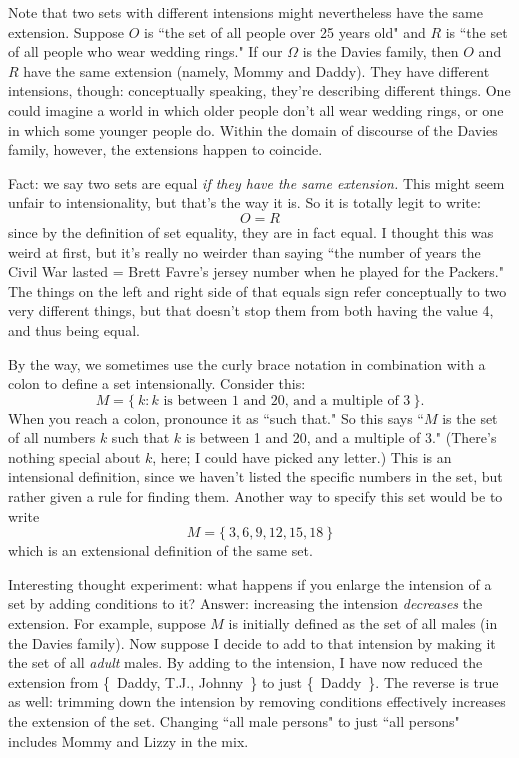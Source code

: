 Note that two sets with different intensions might nevertheless have
the same extension. Suppose $O$ is ``the set of all people over 25 years
old" and $R$ is ``the set of all people who wear wedding rings." If our
$\Omega$ is the Davies family, then $O$ and $R$ have the same extension
(namely, Mommy and Daddy). They have different intensions, though:
conceptually speaking, they're describing different things. One could
imagine a world in which older people don't all wear wedding rings, or one
in which some younger people do. Within the domain of discourse of the
Davies family, however, the extensions happen to coincide.

Fact: we say two sets are equal \textit{if they have the same extension.}
 This might seem unfair to intensionality, but
that's the way it is. So it is totally legit to write:
\[
O = R
\]
since by the definition of set equality, they are in fact equal. I thought
this was weird at first, but it's really no weirder than saying ``the
number of years the Civil War lasted = Brett Favre's jersey number when he
played for the Packers." The things on the left and right side of that
equals sign refer conceptually to two very different things, but that
doesn't stop them from both having the value 4, and thus being equal.

By the way, we sometimes use the curly brace notation in combination with a
colon to define a set intensionally. Consider this:
\[
M = \{~k : \text{$k$ is between 1 and 20, and a multiple of 3}~\}.
\]
When you reach a colon, pronounce it as ``such that." So this says ``$M$ is
the set of all numbers $k$ such that $k$ is between 1 and 20, and a
multiple of 3." (There's nothing special about $k$, here; I could have
picked any letter.) This is an intensional definition, since we haven't listed
the specific numbers in the set, but rather given a rule for finding them.
Another way to specify this set would be to write
\[
M = \{~3,6,9,12,15,18~\}
\]
which is an extensional definition of the same set.

Interesting thought experiment: what happens if you enlarge the intension
of a set by adding conditions to it?  Answer: increasing the intension
\textit{decreases} the extension. For example, suppose $M$ is initially
defined as the set of all males (in the Davies family). Now suppose I
decide to add to that intension by making it the set of all \textit{adult}
males. By adding to the intension, I have now reduced the extension from 
\{~Daddy, T.J., Johnny~\} to just \{~Daddy~\}.  The reverse is true as well:
trimming down the intension by removing conditions effectively increases
the extension of the set. Changing ``all male persons" to just ``all
persons" includes Mommy and Lizzy in the mix.


